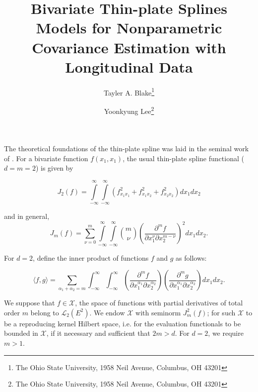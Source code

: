 \documentclass[12pt]{article}
\theoremstyle{definition}
\begin{document}
\title{Bivariate Thin-plate Splines Models for Nonparametric Covariance Estimation with Longitudinal Data}

\author{Tayler A. Blake\thanks{The Ohio State University, 1958 Neil Avenue, Columbus, OH 43201} \and  Yoonkyung Lee\thanks{The Ohio State University, 1958 Neil Avenue, Columbus, OH 43201}}

\maketitle

The theoretical foundations of the thin-plate spline was laid in the seminal work of \citet{duchon1977splines}. For a bivariate function $f\left(x_1,x_1\right)$, the usual thin-plate spline functional ($d=m=2$) is given by

\begin{equation} \label{eq:thin-plate-order-2-penalty}
J_2 \left(f \right) = \int \limits_{-\infty}^{\infty} \int \limits_{-\infty}^{\infty}  \left( f_{{x_1} {x_1}}^2 + f_{{x_1} {x_2}}^2 + f_{{x_2} {x_2}}^2  \right) dx_1 dx_2
\end{equation}

and in general, 
\begin{equation} \label{eq:thin-plate-order-m-penalty}
J_m \left(f \right) = \sum_{\nu=0}^m \int \limits_{-\infty}^{\infty} \int \limits_{-\infty}^{\infty}  {m \choose \nu} \left(  \frac{\partial^m f}{\partial x_1^\nu \partial x_2^{m-\nu}}  \right)^2 dx_1 dx_2 .
\end{equation}

For $d=2$, define the inner product of functions $f$ and $g$ as follows:

\begin{equation} \label{eq:thin-plate-inner-product}
\langle f,g \rangle = \sum_{\alpha_1 + \alpha_2=m} \int_{-\infty}^{\infty} \int_{-\infty}^{\infty} \left(  \frac{\partial^m f}{\partial x_1^{\alpha_1} \partial x_2^{\alpha_2}}  \right)\left(  \frac{\partial^m g}{\partial x_1^{\alpha_1} \partial x_2^{\alpha_2}}  \right) dx_1 dx_2 .
\end{equation}

\bigskip

We suppose that $f \in \mathcal{X}$, the space of functions with partial derivatives of total order $m$ belong to $\mathcal{L}_2\left(E^2\right)$. We endow $\mathcal{X}$ with seminorm $J^2_m\left( f \right)$; for such $\mathcal{X}$ to be a reproducing kernel Hilbert space, i.e. for the evaluation functionals to be bounded in $\mathcal{X}$, if it necessary and sufficient that $2m > d$. For $d=2$, we require $m>1$.
\end{document}
